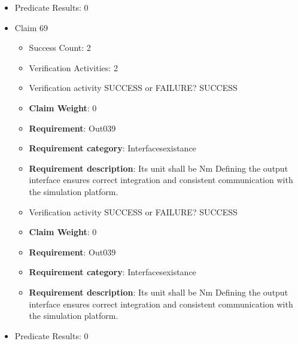 \documentclass{article}
\begin{document}
\begin{itemize}
\begin{itemize}
					\item Verification activity SUCCESS or FAILURE? SUCCESS
					\item \textbf{Claim Weight}: 0
						\item \textbf{Requirement}: Out038 
						\item \textbf{Requirement category}: Interfacesexistance 
						\item \textbf{Requirement description}: Its unit shall be Nm Defining the output interface ensures correct integration and consistent communication with the simulation platform.
					
				\end{itemize}
				
									    
				\item Predicate Results: 0

  				  \item Claim 69
				\begin{itemize}
			    	\item Success Count: 2 
			    	\item Verification Activities: 2
					\item Verification activity SUCCESS or FAILURE? SUCCESS
					\item \textbf{Claim Weight}: 0
						\item \textbf{Requirement}: Out039 
						\item \textbf{Requirement category}: Interfacesexistance 
						\item \textbf{Requirement description}: Its unit shall be Nm Defining the output interface ensures correct integration and consistent communication with the simulation platform.
					
					\item Verification activity SUCCESS or FAILURE? SUCCESS
					\item \textbf{Claim Weight}: 0
						\item \textbf{Requirement}: Out039 
						\item \textbf{Requirement category}: Interfacesexistance 
						\item \textbf{Requirement description}: Its unit shall be Nm Defining the output interface ensures correct integration and consistent communication with the simulation platform.
					
				\end{itemize}
				
									    
				\item Predicate Results: 0


\end{itemize}
\end{document}
